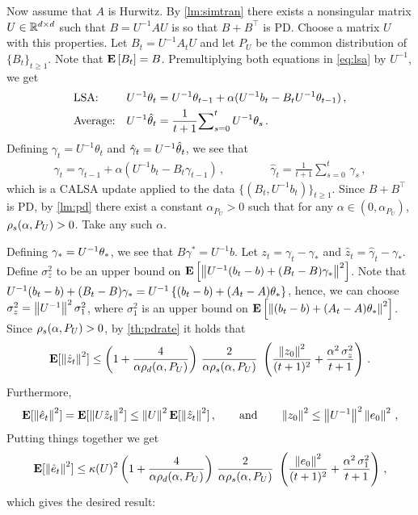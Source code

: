 Now assume that $A$ is Hurwitz. By \cref{lm:simtran} there exists a nonsingular matrix $U\in \mathbb{R}^{d \times d}$ such that
$B = U^{-1} A U$ is so that $B+B^\top$ is PD. 
Choose a matrix $U$ with this properties. 
Let $B_t = U^{-1} A_t U$ and let $P_U$ be the common distribution of $\{B_t\}_{t\ge 1}$. 
Note that $\mathbf{E}\left[B_t\right] = B$.
Premultiplying both equations in \eqref{eq:lsa} by $U^{-1}$, we get
\begin{subequations}\label{eq:lsa2}
\begin{align}
\label{conststep2}&\text{LSA:} &U^{-1} \theta_t&=U^{-1} \theta_{t-1}+\alpha(U^{-1} b_t-B_t U^{-1} \theta_{t-1})\,,\\
\label{iteravg2}&\text{Average:} &U^{-1} \hat{\theta}_t&=\frac{1}{t+1}{\sum}_{s=0}^{t}\,U^{-1} \theta_s\,.
\end{align}
\end{subequations}
Defining $\gamma_t = U^{-1} \theta_t$ and $\hat \gamma_t = U^{-1}\hat{\theta}_t$, we see that
\begin{align*}
\gamma_t =\gamma_{t-1}+\alpha(U^{-1} b_t-B_t \gamma_{t-1})\,, \qquad\qquad
\hat \gamma_t =\frac{1}{t+1}{\sum}_{s=0}^{t}\,\gamma_s \,,
\end{align*}
which is a CALSA update applied to the data $\{(B_t,U^{-1} b_t)\}_{t\ge 1}$. 
Since $B+B^\top$ is PD,
by \cref{lm:pd} there exist a constant $\alpha_{P_U}>0$ such that for any $\alpha\in (0,\alpha_{P_U})$,
$\rho_s(\alpha,P_U)>0$. Take any such $\alpha$.

Defining $\gamma_* = U^{-1} \theta_*$, we see that $B \gamma^* = U^{-1} b$.
Let $z_t = \gamma_t - \gamma_*$ and $\hat z_t = \hat\gamma_t - \gamma_*$.
Define $\sigma_z^2 $
to be an upper bound on $\mathbf{E}\left[ \left\| U^{-1} (b_t-b) + (B_t-B) \gamma_* \right\|^2 \right]$.
Note that $U^{-1} (b_t-b) + (B_t-B) \gamma_* = 
U^{-1} \left\{(b_t-b) +(A_t-A) \theta_*\right\}$, hence, 
we can choose $\sigma_z^2 = \left\| U^{-1}\right\|^2 \sigma_1^2$, where $\sigma_1^2$ is an upper bound on
$\mathbf{E}\left[ \left\|  (b_t-b) +(A_t-A) \theta_* \right\|^2 \right]$.
Since $\rho_s(\alpha,P_U)>0$, by \cref{th:pdrate} it holds that
\begin{align*}
\mathbf{E}[\left\| \hat z_t\right\|^2]
\leq 
\left(1+\frac4{\alpha\rho_d(\alpha,P_U)}\right)\, \frac2{\alpha\rho_s(\alpha,P_U)}\, \,
\left(\frac{\left\| z_0\right\|^2}{(t+1)^2}+ \frac{\alpha^2 \,\sigma_z^2}{t+1} \right)\,.
\end{align*}
Furthermore,
\begin{align*}
\mathbf{E}[ \left\| \hat{e}_t\right\|^2 ] = \mathbf{E}[ \left\|  U \hat z_t\right\|^2 ] \le \left\| U\right\|^2 \mathbf{E}[ \left\| \hat z_t\right\|^2 ]\,,
\qquad
\text{and}
\qquad
\left\| z_0\right\|^2 \le \left\| U^{-1}\right\|^2 \left\| e_0\right\|^2\,,
\end{align*}
Putting things together we get 
\begin{align*}
\mathbf{E}[ \left\| \hat{e}_t\right\|^2 ] \le
\kappa(U)^2 
\left(1+\frac4{\alpha\rho_d(\alpha,P_U)}\right)\, \frac2{\alpha\rho_s(\alpha,P_U)}\, \,
\left(\frac{\left\| e_0\right\|^2}{(t+1)^2}+ \frac{\alpha^2 \,\sigma_1^2}{t+1} \right)\,,
\end{align*}
which gives the desired result:

